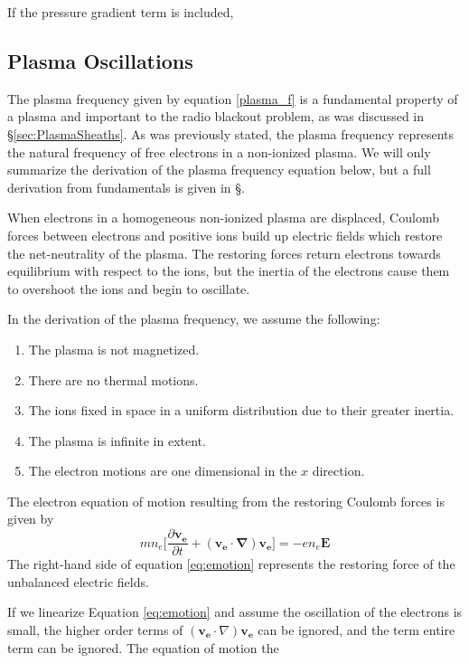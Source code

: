 \documentclass[twocolumn]{article}
\begin{document}
If the pressure gradient term is included, 
\subsection*{Plasma Oscillations}
The plasma frequency given by equation \ref{plasma_f} is a fundamental property of a plasma and important to the radio blackout problem, as was discussed in \S\ref{sec:PlasmaSheaths}.
As was previously stated, the plasma frequency represents the natural frequency of free electrons in a non-ionized plasma.
We will only summarize the derivation of the plasma frequency equation below, but a full derivation from fundamentals is given in \S\cite{chen_introduction_1984}.

When electrons in a homogeneous non-ionized plasma are displaced, Coulomb forces between electrons and positive ions build up electric fields which restore the net-neutrality of the plasma.
The restoring forces return electrons towards equilibrium with respect to the ions, but the inertia of the electrons cause them to overshoot the ions and begin to oscillate.

In the derivation of the plasma frequency, we assume the following:
\begin{enumerate}
	\item The plasma is not magnetized.
	\item There are no thermal motions.
	\item The ions fixed in space in a uniform distribution due to their greater inertia.
	\item The plasma is infinite in extent.
	\item The electron motions are one dimensional in the $x$ direction.
\end{enumerate}

The electron equation of motion resulting from the restoring Coulomb forces is given by
\begin{equation} \label{eq:emotion}
	mn_e \lbrack \frac{\partial \mathbf{v_e}}{\partial t} + \left( \mathbf{v_e} \cdot \mathbf{\nabla} \right) \mathbf{v_e} \rbrack = -en_e\mathbf{E}
\end{equation}
The right-hand side of equation \ref{eq:emotion} represents the restoring force of the unbalanced electric fields.

If we linearize Equation \ref{eq:emotion} and assume the oscillation of the electrons is small, the higher order terms of $\left(\mathbf{v_e} \cdot \nabla \right) \mathbf{v_e}$ can be ignored, and the term entire term can be ignored.
The equation of motion the
\end{document}
